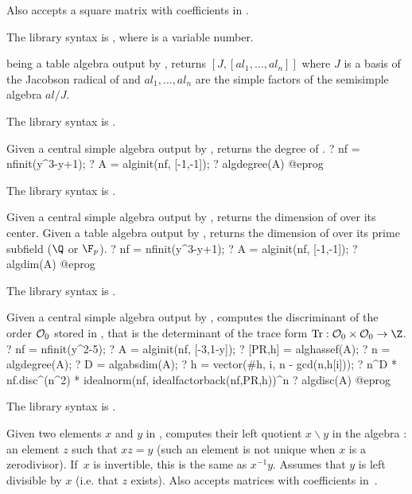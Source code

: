 Also accepts a square matrix with coefficients in .

The library syntax is , where  is a variable number.

\label{se:algdecomposition}
 being a table algebra output by , returns
$[J,[al_1,\dots,al_n]]$ where $J$ is a basis of the Jacobson radical of
 and $al_1,\dots,al_n$ are the simple factors of the semisimple
algebra $al/J$.

The library syntax is .

\label{se:algdegree}
Given a central simple algebra  output by , returns
the degree of .
\bprog
? nf = nfinit(y^3-y+1);
? A = alginit(nf, [-1,-1]);
? algdegree(A)
@eprog

The library syntax is .

\label{se:algdim}
Given a central simple algebra  output by , returns
the dimension of  over its center. Given a table algebra 
output by , returns the dimension of  over its prime
subfield ($\Q$ or $\F_p$).
\bprog
? nf = nfinit(y^3-y+1);
? A = alginit(nf, [-1,-1]);
? algdim(A)
@eprog

The library syntax is .

\label{se:algdisc}
Given a central simple algebra  output by , computes
the discriminant of the order ${\cal O}_0$ stored in , that is the
determinant of the trace form $\rm{Tr} : {\cal O}_0\times {\cal O}_0 \to \Z$.
\bprog
? nf = nfinit(y^2-5);
? A = alginit(nf, [-3,1-y]);
? [PR,h] = alghassef(A);
? n = algdegree(A);
? D = algabsdim(A);
? h = vector(#h, i, n - gcd(n,h[i]));
? n^D * nf.disc^(n^2) * idealnorm(nf, idealfactorback(nf,PR,h))^n
? algdisc(A)
@eprog

The library syntax is .

\label{se:algdivl}
Given two elements $x$ and $y$ in , computes their left quotient
$x\backslash y$ in the algebra : an element $z$ such that $xz=y$ (such
an element is not unique when $x$ is a zerodivisor). If~$x$ is invertible, this
is the same as $x^{-1}y$. Assumes that $y$ is left divisible by $x$ (i.e. that
$z$ exists). Also accepts matrices with coefficients in~.

